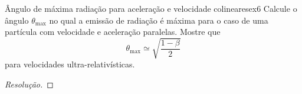 \begin{exercício}{Ângulo de máxima radiação para aceleração e velocidade colineares}{ex6}
    Calcule o ângulo \(\theta_\mathrm{max}\) no qual a emissão de radiação é máxima para o caso de uma partícula com velocidade e aceleração paralelas. Mostre que 
    \begin{equation*}
        \theta_\mathrm{max} \simeq \sqrt{\frac{1 - \beta}{2}}
    \end{equation*}
    para velocidades ultra-relativísticas.
\end{exercício}
\begin{proof}[Resolução]
    
\end{proof}
